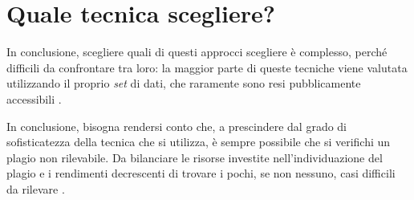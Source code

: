 \section{Quale tecnica scegliere?}
In conclusione, scegliere quali di questi approcci scegliere è complesso, perché difficili da confrontare tra loro: la maggior parte di queste tecniche viene valutata utilizzando il proprio \textit{set} di dati, che raramente sono resi pubblicamente accessibili \cite{karnalim-budi-toba-joy-2019}.

In conclusione, bisogna rendersi conto che, a prescindere dal grado di sofisticatezza della tecnica che si utilizza, è sempre possibile che si verifichi un plagio non rilevabile.
%
Da bilanciare le risorse investite nell'individuazione del plagio e i rendimenti decrescenti di trovare i pochi, se non nessuno, casi difficili da rilevare \cite{joy-99}.



